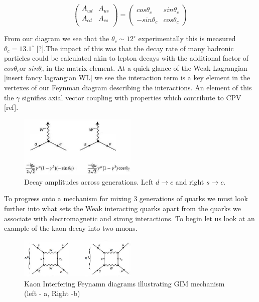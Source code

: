 \[  \left( \begin{array}{ccc} 
A_{ud} & A_{us} \\
A_{cd} & A_{cs}  \\
\end{array} \right)
 = \left( \begin{array}{ccc}
 cos\theta_{c} & sin\theta_{c} \\
 -sin\theta_{c} & cos\theta_{c} \end{array} \right) \]

From our diagram we see that the $\theta_c\sim 12^{\circ}$ experimentally this is measured $\theta_c = 13.1^{\circ}$ [?].The impact of this was that the decay rate of many hadronic particles could be calculated akin to lepton decays with the additional factor of $cos\theta_c$or $sin\theta_c$ in the matrix element. At a quick glance of the Weak Lagrangian [insert fancy lagrangian WL] we see the interaction term is a key element in the vertexes of our Feynman diagram describing the interactions. An element of this the $\gamma$ signifies axial vector coupling with properties which contribute to CPV [ref].

\begin{figure}[h]
\centering
\includegraphics[width=0.5\textwidth]{figs/ckmfig2.jpg}
\caption{Decay amplitudes across generations. Left $d\rightarrow c$ and right $s\rightarrow c$.}
\label{fey1}
\end{figure}


To progress onto a mechanism for mixing 3 generations of quarks we must look further into what sets the Weak interacting quarks apart from the quarks we associate with electromagnetic and strong interactions. To begin let us look at an example of the kaon decay into two muons.
 
\begin{figure}[h]
\centering
\includegraphics[width=0.5\textwidth]{figs/ckmfig3.jpg}
\caption{Kaon Interfering Feynamn diagrams illustrating GIM mechanism (left - a, Right -b)}
\label{fey2}
\end{figure}


